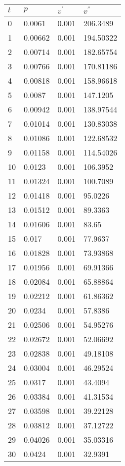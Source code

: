 \documentclass[twocolumn]{article}
\begin{document}
\begin{tabular}{l|l|l|l}
$	t$ &$ p$ &$ v^{'}$ & $v^{''}$ \\ \hline
0	&	0.0061	&	0.001	&	206.3489 \\ \hline
1	&	0.00662	&	0.001	&	194.50322 \\ \hline
2	&	0.00714	&	0.001	&	182.65754 \\ \hline
3	&	0.00766	&	0.001	&	170.81186 \\ \hline
4	&	0.00818	&	0.001	&	158.96618 \\ \hline
5	&	0.0087	&	0.001	&	147.1205 \\ \hline
6	&	0.00942	&	0.001	&	138.97544 \\ \hline
7	&	0.01014	&	0.001	&	130.83038 \\ \hline
8	&	0.01086	&	0.001	&	122.68532 \\ \hline
9	&	0.01158	&	0.001	&	114.54026 \\ \hline
10	&	0.0123	&	0.001	&	106.3952 \\ \hline
11	&	0.01324	&	0.001	&	100.7089 \\ \hline
12	&	0.01418	&	0.001	&	95.0226 \\ \hline
13	&	0.01512	&	0.001	&	89.3363 \\ \hline
14	&	0.01606	&	0.001	&	83.65 \\ \hline
15	&	0.017	&	0.001	&	77.9637 \\ \hline
16	&	0.01828	&	0.001	&	73.93868 \\ \hline
17	&	0.01956	&	0.001	&	69.91366 \\ \hline
18	&	0.02084	&	0.001	&	65.88864 \\ \hline
19	&	0.02212	&	0.001	&	61.86362 \\ \hline
20	&	0.0234	&	0.001	&	57.8386 \\ \hline
21	&	0.02506	&	0.001	&	54.95276 \\ \hline
22	&	0.02672	&	0.001	&	52.06692 \\ \hline
23	&	0.02838	&	0.001	&	49.18108 \\ \hline
24	&	0.03004	&	0.001	&	46.29524 \\ \hline
25	&	0.0317	&	0.001	&	43.4094 \\ \hline
26	&	0.03384	&	0.001	&	41.31534 \\ \hline
27	&	0.03598	&	0.001	&	39.22128 \\ \hline
28	&	0.03812	&	0.001	&	37.12722 \\ \hline
29	&	0.04026	&	0.001	&	35.03316 \\ \hline
30	&	0.0424	&	0.001	&	32.9391 \\ \hline

\end{tabular}
\end{document}
